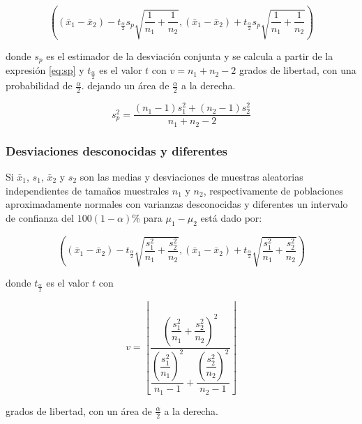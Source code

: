\documentclass[]{book}
\begin{document}
\begin{equation} 
\left( \left( \bar{x}_1 - \bar{x}_2 \right) - t_{\frac{\alpha}{2}}s_p\sqrt{\dfrac{1}{n_1} + \dfrac{1}{n_2}} , \left( \bar{x}_1 - \bar{x}_2 \right) + t_{\frac{\alpha}{2}}s_p\sqrt{\dfrac{1}{n_1} + \dfrac{1}{n_2}} \right) 
\label{eq:ic2msd}
\end{equation}

donde \(s_p\) es el estimador de la desviación conjunta y se calcula a partir de la expresión \eqref{eq:sp} y \(t_{\frac{\alpha}{2}}\) es el valor \(t\) con \(v=n_1+n_2-2\) grados de libertad, con una probabilidad de \(\frac{\alpha}{2}\). dejando un área de \(\frac{\alpha}{2}\) a la derecha.

\begin{equation} 
s_p^2 = \dfrac{\left(n_1 - 1 \right)s_1^2+\left(n_2 - 1 \right)s_2^2}{n_1 +n_2 -2} 
\label{eq:sp}
\end{equation}

\hypertarget{desviaciones-desconocidas-y-diferentes}{%
\subsubsection{Desviaciones desconocidas y diferentes}\label{desviaciones-desconocidas-y-diferentes}}

Si \(\bar{x}_1\), \(s_1\), \(\bar{x}_2\) y \(s_2\) son las medias y desviaciones de muestras aleatorias independientes de tamaños muestrales \(n_1\) y \(n_2\), respectivamente de poblaciones aproximadamente normales con varianzas desconocidas y diferentes un intervalo de confianza del \(100\left(1-\alpha \right)\%\) para \(\mu_1 - \mu_2\) está dado por:

\begin{equation} 
\left( \left( \bar{x}_1 - \bar{x}_2 \right) - t_{\frac{\alpha}{2}}\sqrt{\dfrac{s_1^2}{n_1} + \dfrac{s_2^2}{n_2}} , \left( \bar{x}_1 - \bar{x}_2 \right) + t_{\frac{\alpha}{2}}\sqrt{\dfrac{s_1^2}{n_1} + \dfrac{s_2^2}{n_2}} \right) 
\label{eq:ic2msdd}
\end{equation}

donde \(t_{\frac{\alpha}{2}}\) es el valor \(t\) con

\begin{equation} 
v = \left\lfloor\dfrac{\left(\dfrac{s_1^2}{n_1} + \dfrac{s_2^2}{n_2} \right)^2}{\dfrac{\left( \dfrac{s_1^2}{n_1} \right)^2}{n_1-1}+\dfrac{\left( \dfrac{s_2^2}{n_2} \right)^2}{n_2-1}}\right\rfloor
\label{eq:dfsdd}
\end{equation}

grados de libertad, con un área de \(\frac{\alpha}{2}\) a la derecha.
\end{document}
